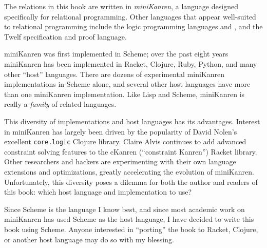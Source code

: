 The relations in this book are written in \emph{miniKanren}, a language
designed specifically for relational programming.
%
Other languages that appear well-suited to relational programming
include the logic programming languages
\lambdaProlog\cite{Miller:2012:PHL} and
\Godel\cite{Hill:1994:GodelLang}, and the Twelf specification and
proof language.

miniKanren was first implemented in Scheme; over the past eight years
miniKanren has been implemented in Racket,
Clojure, Ruby, Python, and many other ``host'' languages.
%
There are dozens of experimental miniKanren implementations in Scheme
alone, and several other host languages have more than one miniKanren
implementation.
%
Like Lisp and Scheme, miniKanren is really a \emph{family} of related
languages.
%

This diversity of implementations and host languages has its advantages.
%
Interest in miniKanren has largely been driven by the popularity of
David Nolen's excellent {\tt core.logic} Clojure library.
%
Claire Alvis continues to add advanced constraint solving features to the
cKanren
(``constraint Kanren'') Racket library.
%
Other researchers and hackers are experimenting with their own
language extensions and optimizations, greatly accelerating the
evolution of miniKanren.
%
Unfortunately, this diversity poses a dilemma for both the author
and readers of this book: which host language and implementation to
use?

%

Since Scheme is the language I know best, and since most academic work
on miniKanren has used Scheme as the host language, I have decided to
write this book using Scheme.  Anyone interested in ``porting'' the
book to Racket, Clojure, or another host language may do so with my
blessing.

